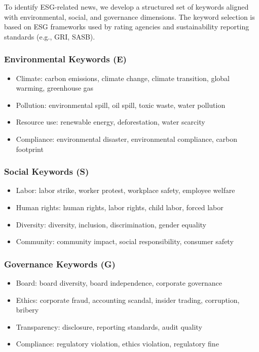 \documentclass[12pt,a4paper]{article}
\begin{document}
To identify ESG-related news, we develop a structured set of keywords aligned with environmental, social, and governance dimensions. The keyword selection is based on ESG frameworks used by rating agencies and sustainability reporting standards (e.g., GRI, SASB).

\subsubsection{Environmental Keywords (E)}
\begin{itemize}[itemsep=0.2em]
    \item Climate: carbon emissions, climate change, climate transition, global warming, greenhouse gas
    \item Pollution: environmental spill, oil spill, toxic waste, water pollution
    \item Resource use: renewable energy, deforestation, water scarcity
    \item Compliance: environmental disaster, environmental compliance, carbon footprint
\end{itemize}

\subsubsection{Social Keywords (S)}
\begin{itemize}[itemsep=0.2em]
    \item Labor: labor strike, worker protest, workplace safety, employee welfare
    \item Human rights: human rights, labor rights, child labor, forced labor
    \item Diversity: diversity, inclusion, discrimination, gender equality
    \item Community: community impact, social responsibility, consumer safety
\end{itemize}

\subsubsection{Governance Keywords (G)}
\begin{itemize}[itemsep=0.2em]
    \item Board: board diversity, board independence, corporate governance
    \item Ethics: corporate fraud, accounting scandal, insider trading, corruption, bribery
    \item Transparency: disclosure, reporting standards, audit quality
    \item Compliance: regulatory violation, ethics violation, regulatory fine
\end{itemize}
\end{document}
